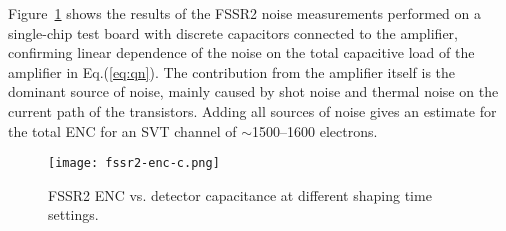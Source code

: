 Figure~\ref{fig:fssr2-enc-c} shows the results of the FSSR2 noise measurements performed on a single-chip test
board with discrete capacitors connected to the amplifier, confirming linear dependence of the noise on the total
capacitive load of the amplifier in Eq.(\ref{eq:qn}). The contribution from the amplifier itself is the dominant
source of noise, mainly caused by shot noise and thermal noise on the current path of the transistors. Adding all
sources of noise gives an estimate for the total ENC for an SVT channel of $\sim$1500--1600 electrons.

\begin{figure}[hbt] 
\centering 
\texttt{[image: fssr2-enc-c.png]}
\caption{FSSR2 ENC vs. detector capacitance at different shaping time settings.}
\label{fig:fssr2-enc-c}
\end{figure}
